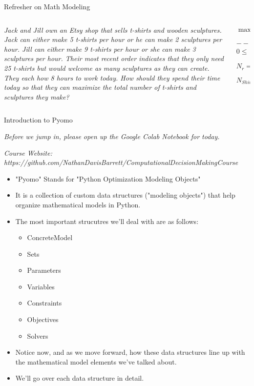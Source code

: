 \documentclass[10pt, aspectratio=169]{beamer}
\begin{document}
\begin{frame}{Refresher on Math Modeling}    
    \begin{columns}
        \begin{column}{0.5\textwidth}
            \textit{Jack and Jill own an Etsy shop that sells t-shirts and wooden sculptures. Jack can either make 5 t-shirts per hour or he can make 2 sculptures per hour. Jill can either make 9 t-shirts per hour or she can make 3 sculptures per hour. Their most recent order indicates that they only need 25 t-shirts but would welcome as many sculptures as they can create. They each how 8 hours to work today. How should they spend their time today so that they can maximize the total number of t-shirts and sculptures they make?}
        \end{column}
        \begin{column}{0.5\textwidth}
            $$\max \sum_{r\in\textbf{R}} N_{r}$$
            $$---\ subject\ to\ (s.t.)\ ---$$
            $$0 \leq \sum_{r \in \textbf{R}} H_{p,r} \leq \tau^{DAY} \ \ \forall p \in \textbf{P}$$
            $$N_{r} = \sum_{p \in \textbf{P}} \alpha_{p,r} H_{p,r}\ \ \ \forall r \in \textbf{R}$$
            $$N_{Shirts} = \kappa$$
        \end{column}
    \end{columns}
\end{frame}

\begin{frame}{Introduction to Pyomo}
    \begin{center}
        \textit{Before we jump in, please open up the Google Colab Notebook for today.}

        \textit{Course Website: https://github.com/NathanDavisBarrett/ComputationalDecisionMakingCourse}
    \end{center}

    \begin{itemize}
        \item "Pyomo" Stands for "Python Optimization Modeling Objects"
        \item It is a collection of custom data structures ("modeling objects") that help organize mathematical models in Python.
        \item The most important strucutres we'll deal with are as follows:
        \begin{itemize}
            \item ConcreteModel
            \item Sets
            \item Parameters
            \item Variables
            \item Constraints
            \item Objectives
            \item Solvers
        \end{itemize}
        \item Notice now, and as we move forward, how these data structures line up with the mathematical model elements we've talked about.
        \item We'll go over each data structure in detail.
    \end{itemize}
\end{frame}
\end{document}
